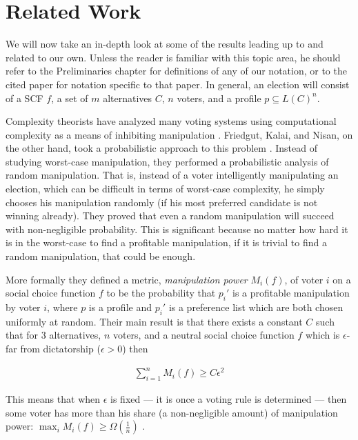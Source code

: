 
\chapter{Related Work}

	We will now take an in-depth look at some of the results leading up to and related to our own. Unless the reader is familiar with this topic area, he should refer to the Preliminaries chapter for definitions of any of our notation, or to the cited paper for notation specific to that paper. In general, an election will consist of a SCF $f$, a set of $m$ alternatives $C$, $n$ voters, and a profile $p \subseteq L(C)^n$.

	Complexity theorists have analyzed many voting systems using computational complexity as a means of inhibiting manipulation \cite{bartholdi1989computational, hemaspaandra2009hybrid}. Friedgut, Kalai, and Nisan, on the other hand, took a probabilistic approach to this problem \cite{friedgut2008elections}. Instead of studying worst-case manipulation, they performed a probabilistic analysis of random manipulation. That is, instead of a voter intelligently manipulating an election, which can be difficult in terms of worst-case complexity, he simply chooses his manipulation randomly (if his most preferred candidate is not winning already). They proved that even a random manipulation will succeed with non-negligible probability. This is significant because no matter how hard it is in the worst-case to find a profitable manipulation, if it is trivial to find a random manipulation, that could be enough.

	More formally they defined a metric, \emph{manipulation power} $M_i(f)$, of voter $i$ on a social choice function $f$ to be the probability that $p_i'$ is a profitable manipulation by voter $i$, where $p$ is a profile and $p_i'$ is a preference list which are both chosen uniformly at random. Their main result is that there exists a constant $C$ such that for 3 alternatives, $n$ voters, and a neutral social choice function $f$ which is $\epsilon$-far from dictatorship ($\epsilon > 0$) then

	\begin{align*}
		\sum_{i=1}^n M_i(f) \ge C \epsilon^2
	\end{align*}

	This means that when $\epsilon$ is fixed --- it is once a voting rule is determined --- then some voter has more than his share (a non-negligible amount) of manipulation power: $\max_i M_i(f) \ge \Omega(\frac{1}{n})$ \cite{friedgut2008elections}.

